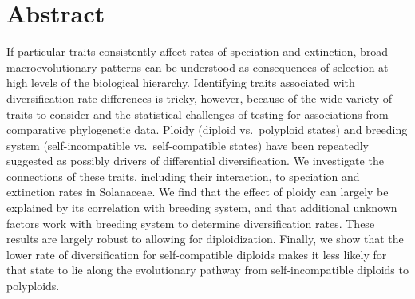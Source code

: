 \section{Abstract}

If particular traits consistently affect rates of speciation and extinction, broad macroevolutionary patterns can be understood as consequences of selection at high levels of the biological hierarchy.
Identifying traits associated with diversification rate differences is tricky, however, because of the wide variety of traits to consider and the statistical challenges of testing for associations from comparative phylogenetic data.
Ploidy (diploid vs.\ polyploid states) and breeding system (self-incompatible vs.\ self-compatible states) have been repeatedly suggested as possibly drivers of differential diversification.
We investigate the connections of these traits, including their interaction, to speciation and extinction rates in Solanaceae.
We find that the effect of ploidy can largely be explained by its correlation with breeding system, and that additional unknown factors work with breeding system to determine diversification rates.
These results are largely robust to allowing for diploidization.
Finally, we show that the lower rate of diversification for self-compatible diploids makes it less likely for that state to lie along the evolutionary pathway from self-incompatible diploids to polyploids.
